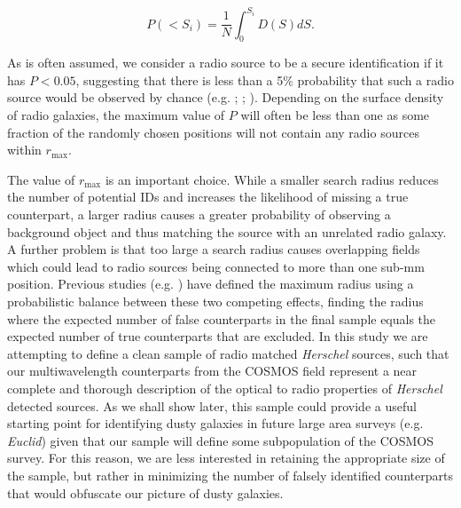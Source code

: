 \begin{equation}
    P(< S_i) = \frac{1}{N}\int_0^{S_i}D(S) dS.
    \label{eq:probability_frequentist}
\end{equation}

As is often assumed, we consider a radio source to be a secure identification if it has $P < 0.05$, suggesting that there is less than a 5\% probability that such a radio source would be observed by chance (e.g. \citealt{Ivison_2002}; \citealt{Ivison_2005}; \citealt{Pope_2006}). Depending on the surface density of radio galaxies, the maximum value of $P$ will often be less than one as some fraction of the randomly chosen positions will not contain any radio sources within $r_{\textrm{max}}$. 

The value of $r_{\textrm{max}}$ is an important choice. While a smaller search radius reduces the number of potential IDs and increases the likelihood of missing a true counterpart, a larger radius causes a greater probability of observing a background object and thus matching the source with an unrelated radio galaxy. A further problem is that too large a search radius causes overlapping fields which could lead to radio sources being connected to more than one sub-mm position. Previous studies (e.g. \citealt{Dye_2009}) have defined the maximum radius using a probabilistic balance between these two competing effects, finding the radius where the expected number of false counterparts in the final sample equals the expected number of true counterparts that are excluded. In this study we are attempting to define a clean sample of radio matched \textit{Herschel} sources, such that our multiwavelength counterparts from the COSMOS field represent a near complete and thorough description of the optical to radio properties of \textit{Herschel} detected sources. As we shall show later, this sample could provide a useful starting point for identifying dusty galaxies in future large area surveys (e.g. \textit{Euclid}) given that our sample will define some subpopulation of the COSMOS survey. For this reason, we are less interested in retaining the appropriate size of the sample, but rather in minimizing the number of falsely identified counterparts that would obfuscate our picture of dusty galaxies. 

